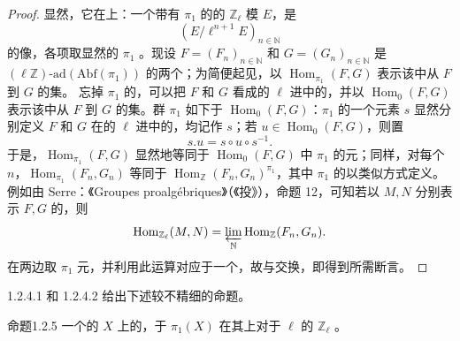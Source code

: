 \begin{proof}
显然，它在上：一个带有 $\pi_1$ 的的 $\mathbb Z_\ell$ 模 $E$，是
\[
(E/\ell^{n+1}E)_{n\in\mathbb N}
\]
的像，各项取显然的 $\pi_1$ 。现设 $F=(F_n)_{n\in\mathbb N}$ 和 $G=(G_n)_{n\in\mathbb N}$ 是 $(\ell\mathbb Z)\text{-}\mathrm{ad}(\mathrm{Abf}(\pi_1))$ 的两个；为简便起见，以 $\operatorname{Hom}_{\pi_1}(F,G)$ 表示该中从 $F$ 到 $G$ 的集。
忘掉 $\pi_1$ 的，可以把 $F$ 和 $G$ 看成的 $\ell$ 进中的，并以 $\operatorname{Hom}_0(F,G)$ 表示该中从 $F$ 到 $G$ 的集。群 $\pi_1$ 如下于 $\operatorname{Hom}_0(F,G)$：$\pi_1$ 的一个元素 $s$ 显然分别定义 $F$ 和 $G$ 在的 $\ell$ 进中的，均记作 $s$；若 $u\in\operatorname{Hom}_0(F,G)$，则置
\[
s.u=s\circ u\circ s^{-1}.
\]
于是，$\operatorname{Hom}_{\pi_1}(F,G)$ 显然地等同于 $\operatorname{Hom}_0(F,G)$ 中 $\pi_1$ 的元；同样，对每个 $n$，$\operatorname{Hom}_{\pi_1}(F_n,G_n)$ 等同于 $\operatorname{Hom}_{\mathbb Z}(F_n,G_n)^{\pi_1}$，其中 $\pi_1$ 的以类似方式定义。例如由 Serre：《Groupes proalgébriques》（《投》），命题 12，可知若以 $M,N$ 分别表示 $F,G$ 的，则
\[
\operatorname{Hom}_{\mathbb Z_\ell}(M,N)
=\varprojlim_{\mathbb N}\operatorname{Hom}_{\mathbb Z}(F_n,G_n).
\]
在两边取 $\pi_1$ 元，并利用此运算对应于一个，故与交换，即得到所需断言。
\end{proof}
 1.2.4.1 和 1.2.4.2 给出下述较不精细的命题。
\begin{SGAresult}{命题}{1.2.5}
一个的 $X$ 上的，于 $\pi_1(X)$ 在其上对于 $\ell$ 的 $\mathbb Z_\ell$ 。
\end{SGAresult}
